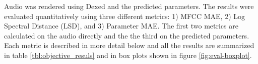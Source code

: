 %

Audio was rendered using Dexed and the predicted parameters. The results were evaluated quantitatively using three different metrics: 1) MFCC MAE,  2) Log Spectral Distance (LSD), and 3) Parameter MAE. The first two metrics are calculated on the audio directly and the the third on the predicted parameters. Each metric is described in more detail below and all the results are summarized in table \ref{tbl:objective_resuls} and in box plots shown in figure \ref{fig:eval-boxplot}.


